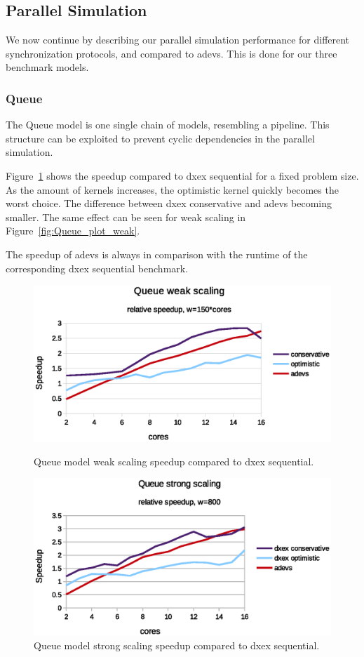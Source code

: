 \subsection{Parallel Simulation}
We now continue by describing our parallel simulation performance for different synchronization protocols, and compared to adevs.
This is done for our three benchmark models.

\subsubsection{Queue}
The Queue model is one single chain of models, resembling a pipeline.
This structure can be exploited to prevent cyclic dependencies in the parallel simulation.

Figure~\ref{fig:Queue_plot_strong} shows the speedup compared to dxex sequential for a fixed problem size.
As the amount of kernels increases, the optimistic kernel quickly becomes the worst choice.
The difference between dxex conservative and adevs becoming smaller.
The same effect can be seen for weak scaling in Figure~\ref{fig:Queue_plot_weak}.

The speedup of adevs is always in comparison with the runtime of the corresponding dxex sequential benchmark.
\begin{figure}
	\center
	
	\includegraphics[width=\columnwidth]{fig/queue_fixed_weak_speedup.eps}
	\caption{Queue model weak scaling speedup compared to dxex sequential.}
	\label{fig:Queue_plot_weak}
	
	\includegraphics[width=\columnwidth]{fig/queue_fixed_strong_speedup.eps}
	\caption{Queue model strong scaling speedup compared to dxex sequential.}
	\label{fig:Queue_plot_strong}
		
\end{figure}

